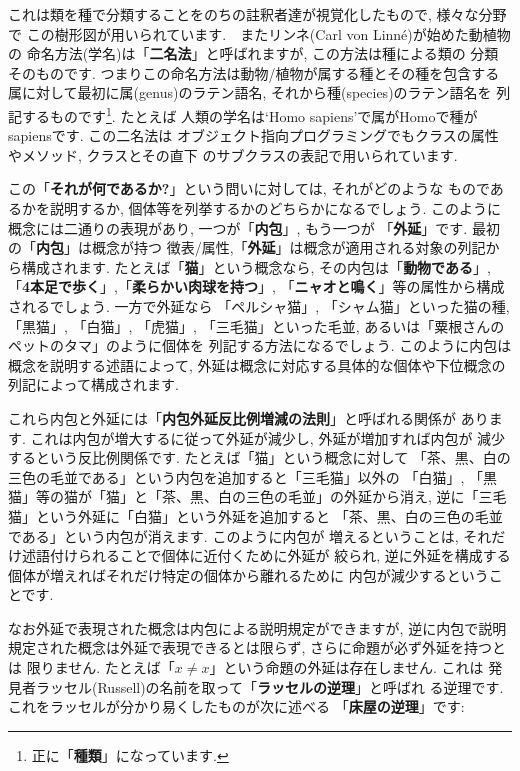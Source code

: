 \documentclass[b5j,8pt,twocolumn]{ltjsarticle}
\begin{document}
これは類を種で分類することをのちの註釈者達が視覚化したもので, 様々な分野で
この樹形図が用いられています.　またリンネ(Carl von Linn\'e)が始めた動植物の
命名方法(学名)は「\textbf{二名法}」と呼ばれますが, この方法は種による類の
分類そのものです. つまりこの命名方法は動物/植物が属する種とその種を包含する
属に対して最初に属(genus)のラテン語名, それから種(species)のラテン語名を
列記するものです\footnote{正に「\textbf{種類}」になっています.}. たとえば
人類の学名は`Homo sapiens'で属がHomoで種がsapiensです. この二名法は
オブジェクト指向プログラミングでもクラスの属性やメソッド, クラスとその直下
のサブクラスの表記で用いられています.
\newline


この「\textbf{それが何であるか?}」という問いに対しては, それがどのような
ものであるかを説明するか, 個体等を列挙するかのどちらかになるでしょう.
 このように概念には二通りの表現があり, 一つが「\textbf{内包}」, もう一つが
「\textbf{外延}」です. 最初の「\textbf{内包}」は概念が持つ
徴表/属性,「\textbf{外延}」は概念が適用される対象の列記から構成されます.
 たとえば「\textbf{猫}」という概念なら, その内包は「\textbf{動物である}」,
 「\textbf{4本足で歩く}」,「\textbf{柔らかい肉球を持つ}」,
 「\textbf{ニャオと鳴く}」等の属性から構成されるでしょう. 一方で外延なら
 「ペルシャ猫」, 「シャム猫」といった猫の種, 「黒猫」, 「白猫」, 「虎猫」,
 「三毛猫」といった毛並, あるいは「粟根さんのペットのタマ」のように個体を
列記する方法になるでしょう. このように内包は概念を説明する述語によって,
 外延は概念に対応する具体的な個体や下位概念の列記によって構成されます.
\newline


これら内包と外延には「\textbf{内包外延反比例増減の法則}」と呼ばれる関係が
あります. これは内包が増大するに従って外延が減少し, 外延が増加すれば内包が
減少するという反比例関係です. たとえば「猫」という概念に対して
「茶、黒、白の三色の毛並である」という内包を追加すると「三毛猫」以外の
「白猫」, 「黒猫」等の猫が「猫」と「茶、黒、白の三色の毛並」の外延から消え,
 逆に「三毛猫」という外延に「白猫」という外延を追加すると
「茶、黒、白の三色の毛並である」という内包が消えます. このように内包が
増えるということは, それだけ述語付けられることで個体に近付くために外延が
絞られ, 逆に外延を構成する個体が増えればそれだけ特定の個体から離れるために
内包が減少するということです.
\newline

なお外延で表現された概念は内包による説明規定ができますが, 逆に内包で説明
規定された概念は外延で表現できるとは限らず, さらに命題が必ず外延を持つとは
限りません. たとえば「$x \neq x$」という命題の外延は存在しません. これは
発見者ラッセル(Russell)の名前を取って「\textbf{ラッセルの逆理}」と呼ばれ
る逆理です. これをラッセルが分かり易くしたものが次に述べる
「\textbf{床屋の逆理}」です:
\end{document}
